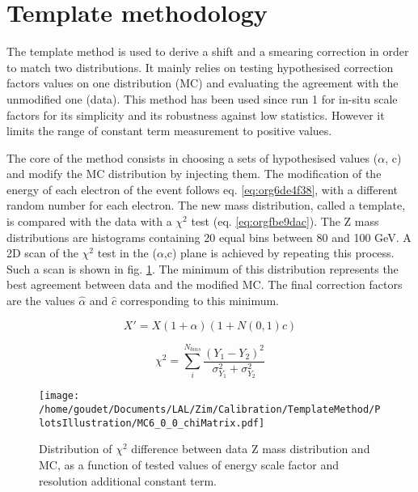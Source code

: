\section{Template methodology}
\label{sec:orgc421dd0}

The template method is used to derive a shift and a smearing correction in order to match two distributions.
It mainly relies on testing hypothesised correction factors values on one distribution (MC) and evaluating the agreement with the unmodified one (data).
This method has been used since run 1 for in-situ scale factors for its simplicity and its robustness against low statistics.
However it limits the range of constant term measurement to positive values.

The core of the method consists in choosing a sets of hypothesised values (\(\alpha\), c) and modify the MC distribution by injecting them.
The modification of the energy of each electron of the event follows eq. \ref{eq:org6de4f38}, with a different random number for each electron.
The new mass distribution, called a template, is compared with the data with a $\chi^2$ test (eq. \ref{eq:orgfbe9dac}).
The Z mass distributions are histograms containing 20 equal bins between 80 and 100 GeV.
A 2D scan of the $\chi^2$ test in the (\(\alpha\),c) plane is achieved by repeating this process.
Such a scan is shown in fig. \ref{fig:orgc320d11}.
The minimum of this distribution represents the best agreement between data and the modified MC.
The final correction factors are the values \(\hat{\alpha}\) and \(\hat{c}\) corresponding to this minimum.

\begin{equation}
\label{eq:org6de4f38}
  X' = X(1+\alpha)(1+N(0,1)c)
\end{equation}

\begin{equation}
\label{eq:orgfbe9dac}
\chi^2 = \sum \limits_i^{N_{bins}} \frac{(Y_1-Y_2)^2}{\sigma_{Y_1}^2 + \sigma_{Y_2}^2}
\end{equation}

\begin{figure}[htbp]
\centering
\texttt{[image: /home/goudet/Documents/LAL/Zim/Calibration/TemplateMethod/PlotsIllustration/MC6\_0\_0\_chiMatrix.pdf]}
\caption{\label{fig:orgc320d11}
Distribution of $\chi^2$ difference between data Z mass distribution and MC, as a function of tested values of energy scale factor and resolution additional constant term.}
\end{figure}

